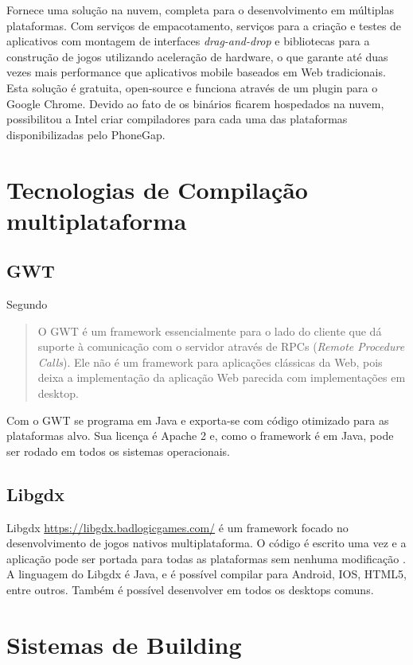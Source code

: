 Fornece uma solução na nuvem, completa para o desenvolvimento em
múltiplas plataformas. Com serviços de empacotamento, serviços
para a criação e testes de aplicativos com montagem de interfaces
\textit{drag-and-drop} e bibliotecas para a construção de jogos
utilizando aceleração de hardware, o que garante até duas vezes mais
performance que aplicativos mobile baseados em Web tradicionais. Esta
solução é gratuita, open-source e funciona através de um plugin
para o Google Chrome. Devido ao fato de os binários ficarem hospedados
na nuvem, possibilitou a Intel criar compiladores para cada uma das
plataformas disponibilizadas pelo PhoneGap.

\chapter{Tecnologias de Compilação multiplataforma}

\section{GWT}
Segundo \citet[p. 29]{gwt}
\begin{quote}
O GWT é um framework essencialmente para o lado do cliente que dá
suporte à comunicação com o servidor através de RPCs (\textit{Remote
Procedure Calls}). Ele não é um framework para aplicações clássicas
da Web, pois deixa a implementação da aplicação Web parecida com
implementações em desktop.
\end{quote}

Com o GWT se programa em Java e exporta-se com código otimizado para
as plataformas alvo. Sua licença é Apache 2 e, como o framework é em
Java, pode ser rodado em todos os sistemas operacionais.

\section{Libgdx}

Libgdx \url{https://libgdx.badlogicgames.com/} é um framework
focado no desenvolvimento de jogos nativos multiplataforma. O
código é escrito uma vez e a aplicação pode ser portada para
todas as plataformas sem nenhuma modificação \autocite[p.
8]{crossPlatformMobileGameDevelopment}. A linguagem do Libgdx é Java, e
é possível compilar para Android, IOS, HTML5, entre outros. Também é
possível desenvolver em todos os desktops comuns.

\chapter{Sistemas de Building}

